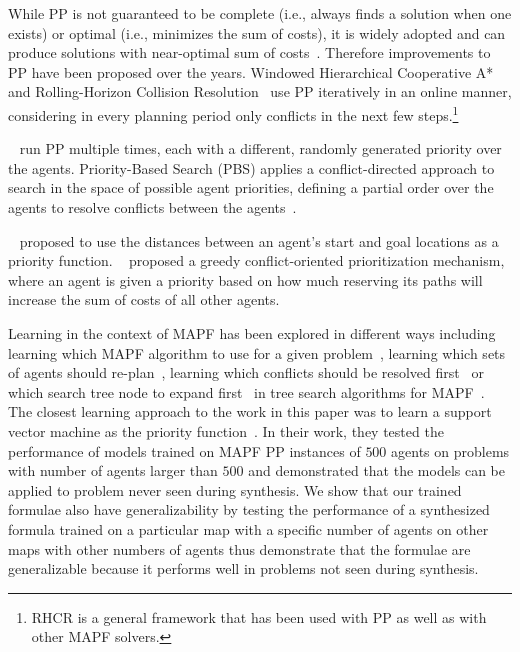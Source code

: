 While PP is not guaranteed to be complete (i.e., always finds a solution when one exists) or optimal (i.e., minimizes the sum of costs), it is widely adopted and can produce solutions with near-optimal sum of costs~\citep{morag2online}. Therefore improvements to PP have been proposed over the years. Windowed Hierarchical Cooperative A*~\citep{silver2005cooperative} and  Rolling-Horizon Collision Resolution~\citep{li2021lifelong} use PP iteratively in an online manner, considering in every planning period only conflicts in the next few steps.\footnote{RHCR is a general framework that has been used with PP as well as with other MAPF solvers.}

~\citet{bennewitz2finding} run PP multiple times, each with a different, randomly generated priority over the agents. Priority-Based Search (PBS) applies a conflict-directed approach to search in the space of possible agent priorities, defining a partial order over the agents to resolve conflicts between the agents~\citep{ma2019searching}.

~\citet{van2005prioritized} proposed to use the distances between an agent's start and goal locations as a priority function. ~\citet{bnaya2014conflict} proposed a greedy conflict-oriented prioritization mechanism, where an agent is given a priority based on how much reserving its paths will increase the sum of costs of all other agents.

Learning in the context of MAPF has been explored in different ways including learning which MAPF algorithm to use for a given problem~\citep{sigurdson2019automatic,ren2021mapfast,alkazzi2mapfaster,kaduri2020algorithm}, learning which sets of agents should re-plan~\citep{huang2anytime}, learning which conflicts should be resolved first~\citep{huang2021learning2} or which search tree node to expand first~\citep{huang2021learning} in tree search algorithms for MAPF~\citep{sharon20conflict,barer2014suboptimal}. The closest learning approach to the work in this paper was to learn a support vector machine as the priority function~\cite{zhang2learning}. In their work, they tested the performance of models trained on MAPF PP instances of $ 500 $ agents on problems with number of agents larger than $ 500 $ and demonstrated that the models can be applied to problem never seen during synthesis. We show that our trained formulae also have generalizability by testing the performance of a synthesized formula trained on a particular map with a specific number of agents on other maps with other numbers of agents thus demonstrate that the formulae are generalizable because it performs well in problems not seen during synthesis.

